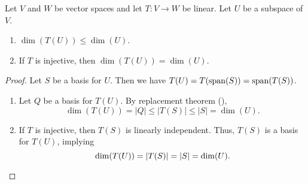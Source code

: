 \begin{lemma}
  \label{thm:dimension-no-increase}
  Let $V$ and $W$ be vector spaces and let $T: V \to W$ be linear.
  Let $U$ be a subspace of $V$.
  \begin{enumerate}
    \item $\dim(T(U)) \leq \dim(U)$.
    \item If $T$ is injective, then $\dim(T(U)) = \dim(U)$.
  \end{enumerate}
\end{lemma}
\begin{proof}
  Let $S$ be a basis for $U$. Then we have $T(U) = T(\operatorname{span}(S)) = \operatorname{span}(T(S))$.
  \begin{enumerate}
    \item Let $Q$ be a basis for $T(U)$.
    By replacement theorem (),
    \begin{equation*}
      \dim(T(U)) = |Q| \leq |T(S)| \leq |S| = \dim(U).
    \end{equation*}
    \item If $T$ is injective, then $T(S)$ is linearly independent.
    Thus, $T(S)$ is a basis for $T(U)$, implying
    \begin{equation*}
      \dim(T(U)) = |T(S)| = |S| = \dim(U).
      \qedhere
    \end{equation*}
  \end{enumerate}
\end{proof}

